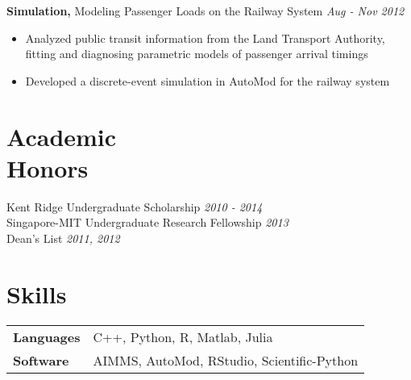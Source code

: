 \documentclass[margin]{res}
\begin{document}
\begin{resume}
{\bf Simulation,} Modeling Passenger Loads on the Railway System \hfill \textit{Aug - Nov 2012}
\begin{itemize} \itemsep -2pt
\item Analyzed public transit information from the Land Transport Authority, fitting and diagnosing parametric models of passenger arrival timings
\item Developed a discrete-event simulation in AutoMod for the railway system
\end{itemize}

\section{Academic \\ Honors}
Kent Ridge Undergraduate Scholarship \hfill \textit{2010 - 2014} \\
Singapore-MIT Undergraduate Research Fellowship \hfill \textit{2013} \\
Dean's List \hfill \textit{2011, 2012}

\section{Skills}
\begin{tabular}{l p{3in}}
\bf{Languages} & C++, Python, R, Matlab, Julia \\
\bf{Software} & AIMMS, AutoMod, RStudio, Scientific-Python
\end{tabular}

\end{resume} 
\end{document}

